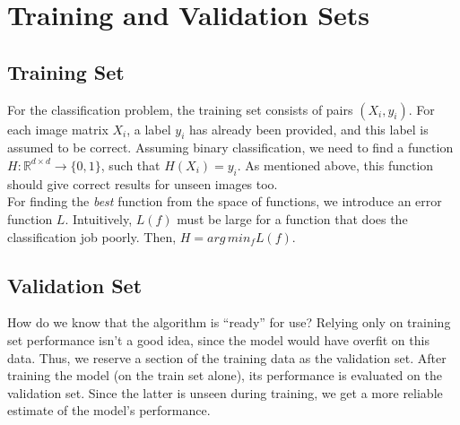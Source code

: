 \documentclass[12pt]{article}
\begin{document}
\section{Training and Validation Sets}


\subsection{Training Set}
For the classification problem, the training set consists of pairs $(X_i,y_i)$. For each image matrix $X_i$, a label $y_i$ has already been provided, and this label is assumed to be correct. Assuming binary classification, we need to find a function $H : \mathbb{R}^{d\times d} \to \{0,1\}$, such that $H(X_i)=y_i$. As mentioned above, this function should give correct results for unseen images too.
\\

\noindent For finding the {\it best} function from the space of functions, we introduce an error function $L$. Intuitively, $L(f)$ must be large for a function that does the classification job poorly. Then, $H = arg\,min_f L(f)$.

\subsection{Validation Set}
How do we know that the algorithm is ``ready'' for use? Relying only on training set performance isn't a good idea, since the model would have overfit on this data. Thus, we reserve a section of the training data as the validation set. After training the model (on the train set alone), its performance is evaluated on the validation set. Since the latter is unseen during training, we get a more reliable estimate of the model's performance.

%


\end{document}
